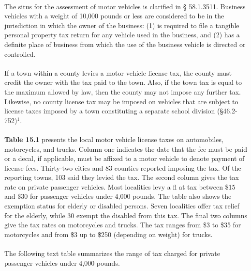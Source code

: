 \documentclass[
]{book}
\begin{document}
~\\
\hspace*{0.333em}\hspace*{0.333em}The situs for the assessment of motor vehicles is clarified in § 58.1.3511. Business vehicles with a weight of 10,000 pounds or less are considered to be in the jurisdiction in which the owner of the business: (1) is required to file a tangible personal property tax return for any vehicle used in the business, and (2) has a definite place of business from which the use of the business vehicle is directed or controlled.\\
~\\
\hspace*{0.333em}\hspace*{0.333em}If a town within a county levies a motor vehicle license tax, the county must credit the owner with the tax paid to the town. Also, if the town tax is equal to the maximum allowed by law, then the county may not impose any further tax. Likewise, no county license tax may be imposed on vehicles that are subject to license taxes imposed by a town constituting a separate school division (§46.2-752)\(^1\).\\
~\\
\hspace*{0.333em}\hspace*{0.333em}\textbf{Table 15.1} presents the local motor vehicle license taxes on automobiles, motorcycles, and trucks. Column one indicates the date that the fee must be paid or a decal, if applicable, must be affixed to a motor vehicle to denote payment of license fees. Thirty-two cities and 83 counties reported imposing the tax. Of the reporting towns, 103 said they levied the tax. The second column gives the tax rate on private passenger vehicles. Most localities levy a fl at tax between \$15 and \$30 for passenger vehicles under 4,000 pounds. The table also shows the exemption status for elderly or disabled persons. Seven localities offer tax relief for the elderly, while 30 exempt the disabled from this tax. The final two columns give the tax rates on motorcycles and trucks. The tax ranges from \$3 to \$35 for motorcycles and from \$3 up to \$250 (depending on weight) for trucks.\\
~\\
\hspace*{0.333em}\hspace*{0.333em}The following text table summarizes the range of tax charged for private passenger vehicles under 4,000 pounds.
\end{document}
